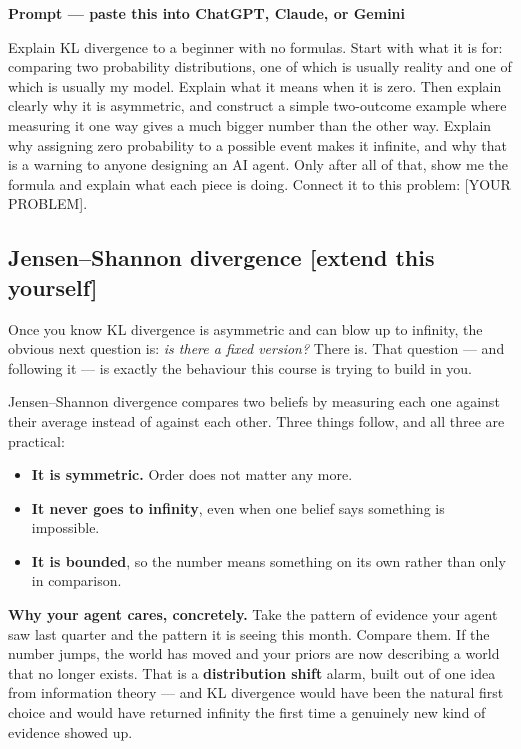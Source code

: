 \documentclass[11pt,a4paper]{article}
\newcommand{\keyword}[1]{\textbf{#1}}
\newcommand{\boxtitle}[1]{{\bfseries #1}\par\vspace{2pt}}
\newcommand{\extend}{\hfill{\footnotesize\sffamily\color{sbaccent}[extend this yourself]}}
\newenvironment{learnprompt}
  {\begin{sbbox}\boxtitle{Prompt --- paste this into ChatGPT, Claude, or Gemini}%
   \ttfamily\small\raggedright}
  {\end{sbbox}}
\begin{document}
\begin{learnprompt}
Explain KL divergence to a beginner with no formulas. Start with what it is for: comparing two
probability distributions, one of which is usually reality and one of which is usually my model.
Explain what it means when it is zero. Then explain clearly why it is asymmetric, and construct
a simple two-outcome example where measuring it one way gives a much bigger number than the other
way. Explain why assigning zero probability to a possible event makes it infinite, and why that
is a warning to anyone designing an AI agent. Only after all of that, show me the formula and
explain what each piece is doing. Connect it to this problem: [YOUR PROBLEM].
\end{learnprompt}

\subsection{Jensen--Shannon divergence \extend}

Once you know KL divergence is asymmetric and can blow up to infinity, the obvious next question
is: \emph{is there a fixed version?} There is. That question --- and following it --- is exactly
the behaviour this course is trying to build in you.

Jensen--Shannon divergence compares two beliefs by measuring each one against their average
instead of against each other. Three things follow, and all three are practical:

\begin{itemize}
  \item \textbf{It is symmetric.} Order does not matter any more.
  \item \textbf{It never goes to infinity}, even when one belief says something is impossible.
  \item \textbf{It is bounded}, so the number means something on its own rather than only in
        comparison.
\end{itemize}

\textbf{Why your agent cares, concretely.} Take the pattern of evidence your agent saw last
quarter and the pattern it is seeing this month. Compare them. If the number jumps, the world has
moved and your priors are now describing a world that no longer exists. That is a
\keyword{distribution shift} alarm, built out of one idea from information theory --- and KL
divergence would have been the natural first choice and would have returned infinity the first
time a genuinely new kind of evidence showed up.
\end{document}
